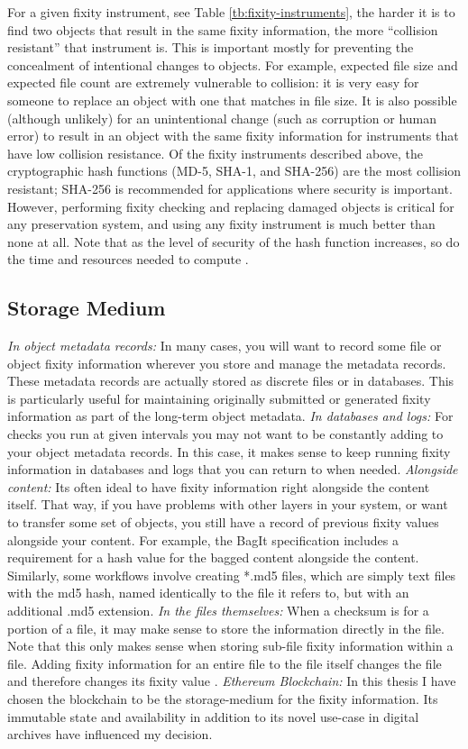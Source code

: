 For a given fixity instrument, see Table \ref{tb:fixity-instruments}, the harder it is to find two objects that result in the same fixity information, the more “collision resistant” that instrument is. This is important mostly for preventing the concealment of intentional changes to objects. For example, expected file size and expected file count are extremely vulnerable to collision: it is very easy for someone to replace an object with one that matches in file size. It is also possible (although unlikely) for an unintentional change (such as corruption or human error) to result in an object with the same fixity information for instruments that have low collision resistance. Of the fixity instruments described above, the cryptographic hash functions (MD-5, SHA-1, and SHA-256) are the most collision resistant; SHA-256 is recommended for applications where security is important. However, performing fixity checking and replacing damaged objects is critical for any preservation system, and using any fixity instrument is much better than none at all. Note that as the level of security of the hash function increases, so do the time and resources needed to compute \cite[7]{ndsa2014fixity}.
\subsection{Storage Medium}
\label{sec:storage-medium}
\textit{In object metadata records:} In many cases, you will want to record some file or object fixity information wherever you store and manage the metadata records. These metadata records are actually stored as discrete files or in databases. This is particularly useful for maintaining originally submitted or generated fixity information as part of the long-term object metadata. 
\textit{In databases and logs:} For checks you run at given intervals you may not want to be constantly adding to your object metadata records. In this case, it makes sense to keep running fixity information in databases and logs that you can return to when needed.
\textit{Alongside content:} Its often ideal to have fixity information right alongside the content itself. That way, if you have problems with other layers in your system, or want to transfer some set of objects, you still have a record of previous fixity values alongside your content. For example, the BagIt specification includes a requirement for a hash value for the bagged content alongside the content. Similarly, some workflows involve creating *.md5 files, which are simply text files with the md5 hash, named identically to the file it refers to, but with an additional .md5 extension.
\textit{In the files themselves:} When a checksum is for a portion of a file, it may make sense to store the information directly in the file. Note that this only makes sense when storing sub-file fixity information within a file. Adding fixity information for an entire file to the file itself changes the file and therefore changes its fixity value \cite[7]{ndsa2014fixity}.
\textit{Ethereum Blockchain:} In this thesis I have chosen the blockchain to be the storage-medium for the fixity information. Its immutable state and availability in addition to its novel use-case in digital archives have influenced my decision.
